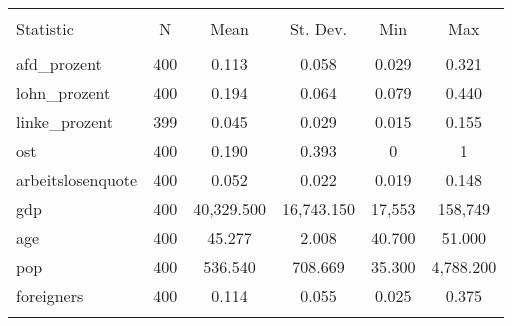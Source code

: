 
\begin{table}[!htbp] \centering 
  \caption{} 
  \label{} 
\begin{tabular}{@{\extracolsep{5pt}}lccccc} 
\\[-1.8ex]\hline 
\hline \\[-1.8ex] 
Statistic & \multicolumn{1}{c}{N} & \multicolumn{1}{c}{Mean} & \multicolumn{1}{c}{St. Dev.} & \multicolumn{1}{c}{Min} & \multicolumn{1}{c}{Max} \\ 
\hline \\[-1.8ex] 
afd\_prozent & 400 & 0.113 & 0.058 & 0.029 & 0.321 \\ 
lohn\_prozent & 400 & 0.194 & 0.064 & 0.079 & 0.440 \\ 
linke\_prozent & 399 & 0.045 & 0.029 & 0.015 & 0.155 \\ 
ost & 400 & 0.190 & 0.393 & 0 & 1 \\ 
arbeitslosenquote & 400 & 0.052 & 0.022 & 0.019 & 0.148 \\ 
gdp & 400 & 40,329.500 & 16,743.150 & 17,553 & 158,749 \\ 
age & 400 & 45.277 & 2.008 & 40.700 & 51.000 \\ 
pop & 400 & 536.540 & 708.669 & 35.300 & 4,788.200 \\ 
foreigners & 400 & 0.114 & 0.055 & 0.025 & 0.375 \\ 
\hline \\[-1.8ex] 
\end{tabular} 
\end{table} 
